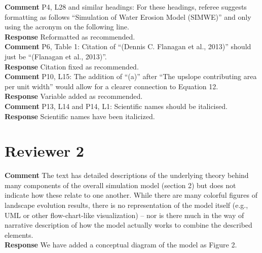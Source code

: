 \documentclass[gmd, manuscript]{copernicus}
\begin{document}
\noindent\textbf{Comment}
P4, L28 and similar headings: For these headings, referee suggests formatting as follows ``Simulation of Water Erosion Model (SIMWE)'' and only using the acronym on the following line.
\\

\noindent\textbf{Response}
Reformatted as recommended.\\

\noindent\textbf{Comment}
P6, Table 1: Citation of ``(Dennis C. Flanagan et al., 2013)'' should just be ``(Flanagan et al., 2013)''.
\\

\noindent\textbf{Response}
Citation fixed as recommended.\\

\noindent\textbf{Comment}
P10, L15: The addition of ``(a)'' after ``The upslope contributing area per unit width'' would allow for a clearer connection to Equation 12.
\\

\noindent\textbf{Response}
Variable added as recommended.
\\

\noindent\textbf{Comment}
P13, L14 and P14, L1: Scientific names should be italicised.
\\

\noindent\textbf{Response}
Scientific names have been italicized. 
\\

\section{Reviewer 2}

\noindent\textbf{Comment}
The text has detailed descriptions of the underlying theory behind many components of the overall simulation model (section 2) but does not indicate how these relate to one another. While there are many colorful figures of landscape evolution results, there is no representation of the model itself (e.g., UML or other flow-chart-like visualization) -- nor is there much in the way of narrative description of how the model actually works to combine the described elements.
\\

\noindent\textbf{Response}
We have added a conceptual diagram of the model as Figure 2.
\\
\end{document}
